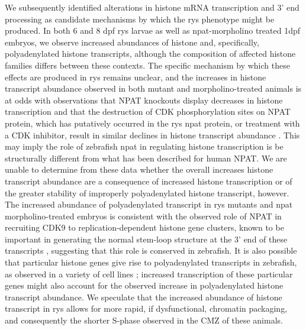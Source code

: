 We subsequently identified alterations in histone mRNA transcription and 3’ end processing as candidate mechanisms by which the rys phenotype might be produced. In both 6 and 8 dpf rys larvae as well as npat-morpholino treated 1dpf embryos, we observe increased abundances of histone and, specifically, polyadenylated histone transcripts, although the composition of affected histone families differs between these contexts. The specific mechanism by which these effects are produced in rys remains unclear, and the increases in histone transcript abundance observed in both mutant and morpholino-treated animals is at odds with observations that NPAT knockouts display decreases in histone transcription \cite{Ye2003} and that the destruction of CDK phosphorylation sites on NPAT protein, which has putatively occurred in the rys npat protein, or treatment with a CDK inhibitor, result in similar declines in histone transcript abundance \cite{Ma2000,Mitra2009}. This may imply the role of zebrafish npat in regulating histone transcription is be structurally different from what has been described for human NPAT. We are unable to determine from these data whether the overall increases histone transcript abundance are a consequence of increased histone transcription or of the greater stability of improperly polyadenylated histone transcript, however. The increased abundance of polyadenylated transcript in rys mutants and npat morpholino-treated embryos is consistent with the observed role of NPAT in recruiting CDK9 to replication-dependent histone gene clusters, known to be important in generating the normal stem-loop structure at the 3’ end of these transcripts \cite{Pirngruber2009}, suggesting that this role is conserved in zebrafish. It is also possible that particular histone genes give rise to polyadenylated transcripts in zebrafish, as observed in a variety of cell lines \cite{Kari2013}; increased transcription of these particular genes might also account for the observed increase in polyadenylated histone transcript abundance. We speculate that the increased abundance of histone transcript in rys allows for more rapid, if dysfunctional, chromatin packaging, and consequently the shorter S-phase observed in the CMZ of these animals.

